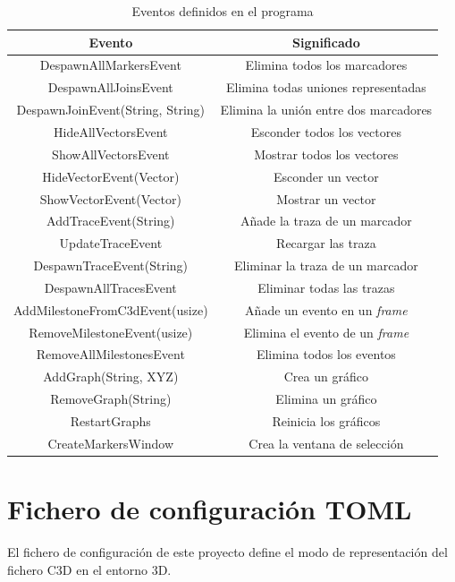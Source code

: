 \begin{table}[H]
  \centering
  \begin{tabular}{c|c}
  \toprule
  {\textbf{Evento}} & {\textbf{Significado}} \\
  \midrule
  DespawnAllMarkersEvent & Elimina todos los marcadores \\
  DespawnAllJoinsEvent & Elimina todas uniones representadas \\
  DespawnJoinEvent(String, String) & Elimina la unión entre dos marcadores \\
  HideAllVectorsEvent & Esconder todos los vectores \\
  ShowAllVectorsEvent & Mostrar todos los vectores \\
  HideVectorEvent(Vector) & Esconder un vector \\
  ShowVectorEvent(Vector) & Mostrar un vector \\  
  AddTraceEvent(String) & Añade la traza de un marcador \\
  UpdateTraceEvent & Recargar las traza \\
  DespawnTraceEvent(String) & Eliminar la traza de un marcador \\
  DespawnAllTracesEvent & Eliminar todas las trazas\\
  AddMilestoneFromC3dEvent(usize) & Añade un evento en un \textit{frame} \\
  RemoveMilestoneEvent(usize) & Elimina el evento de un \textit{frame} \\
  RemoveAllMilestonesEvent & Elimina todos los eventos \\
  AddGraph(String, XYZ) & Crea un gráfico \\
  RemoveGraph(String) & Elimina un gráfico \\
  RestartGraphs & Reinicia los gráficos \\
  CreateMarkersWindow & Crea la ventana de selección \\  
  \bottomrule
  \end{tabular}
  \caption{Eventos definidos en el programa}
  \label{tab:eventos}
\end{table}

\section{Fichero de configuración \acs{TOML}}

El fichero de configuración de este proyecto define el modo de representación del fichero \ac{C3D} en el entorno 3D. 

